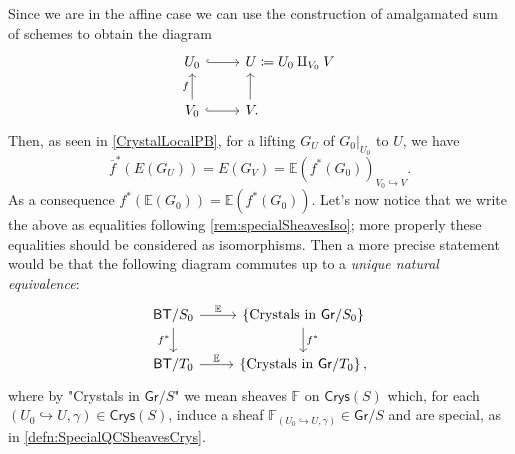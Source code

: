 \begin{rem}\label{PBCrystals}
	Since we are in the affine case we can use the construction of amalgamated
	sum of schemes to obtain the diagram
	\begin{equation*}
	\begin{tikzcd}[/tikz/column 2/.append style={anchor=base west}]
		U_0 \arrow[r, "", hookrightarrow] &
		U \coloneqq U_0 \amalg_{V_0} V \\
		V_0 \arrow[u, "f", rightarrow] 
		\arrow[r, "", hookrightarrow] &
		V \arrow[u, "", rightarrow, end anchor={[xshift=1.84ex,yshift=0.29ex]south west},
		start anchor={[xshift=0.38ex]}] 
	.\end{tikzcd}
	\end{equation*}
	Then, as seen in \cref{CrystalLocalPB}, for a lifting $G_U$ 
	of $\left.G_0\right|_{U_0}$ to $U$, we have
	\begin{equation*}
		\overline{f}^* \left( E(G_U) \right) =
		E(G_V) = \mathbb{E} \left( f^* (G_0) \right)_{V_0 \hookrightarrow V}
	.\end{equation*}
	As a consequence $f^* \left( \mathbb{E}(G_0) \right) =
	\mathbb{E}\left( f^*(G_0) \right)$.
	Let's now notice that we write the above as equalities following \cref{rem:specialSheavesIso};
	more properly these equalities should be considered as isomorphisms.
	Then a more precise statement would be that the following diagram
	commutes up to a \emph{unique natural equivalence}:
	\begin{equation*}
	\begin{tikzcd}
		\mathsf{BT}/S_0
		\arrow[r, "\mathbb{E}", rightarrow] 
		\arrow[d, "f^*"', rightarrow] &
		\left\{ \text{Crystals in } \mathsf{Gr}/S_0 \right\}
		\arrow[d, "f^*", rightarrow] \\
		\mathsf{BT}/T_0 \arrow[r, "\mathbb{E}", rightarrow] &
		\left\{ \text{Crystals in } \mathsf{Gr}/T_0 \right\}
	,\end{tikzcd}
	\end{equation*}
	where by "Crystals in $\mathsf{Gr}/S$" we mean sheaves $\mathbb{F}$ on $\mathsf{Crys}(S)$
	which, for each $\left(U_0 \hookrightarrow U, \gamma\right) \in \mathsf{Crys}(S)$,
	induce a sheaf $\mathbb{F}_{\left(U_0 \hookrightarrow U, \gamma\right)} \in \mathsf{Gr}/S$
	and are special, as in \cref{defn:SpecialQCSheavesCrys}.
\end{rem}



